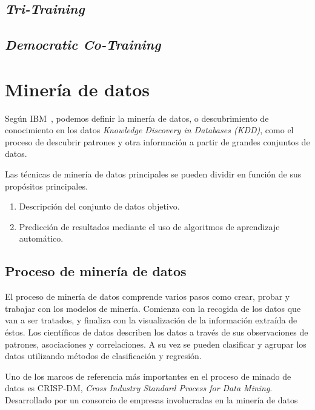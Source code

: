 \subsection{\textit{Tri-Training}}



\subsection{\textit{Democratic Co-Training}}



\vfill
\section{Minería de datos}

Según IBM~\cite{IBM-WhatisDataMining}, podemos definir la minería de datos, o descubrimiento de conocimiento
en los datos \textit{Knowledge Discovery in Databases (KDD)}, como el proceso de descubrir patrones y otra
información a partir de grandes conjuntos de datos. 

Las técnicas de minería de datos principales se pueden dividir en función de sus propósitos principales.
\begin{enumerate}
    \item Descripción del conjunto de datos objetivo.
    \item Predicción de resultados mediante el uso de algoritmos de aprendizaje automático.
\end{enumerate}

\subsection{Proceso de minería de datos}
El proceso de minería de datos comprende varios pasos como crear, probar y trabajar con los modelos de minería. Comienza con la recogida de los datos que van a ser tratados, y finaliza con la visualización de la información extraída de éstos. 
Los científicos de datos describen los datos a través de sus observaciones de patrones, asociaciones y correlaciones. A su vez se pueden clasificar y agrupar los datos utilizando métodos de clasificación y regresión.

Uno de los marcos de referencia más importantes en el proceso de minado de datos es CRISP-DM, \textit{Cross Industry Standard Process for Data Mining}. Desarrollado por un consorcio de empresas involucradas en la minería de datos~\cite{Chapman2000CRISPDM1S}


